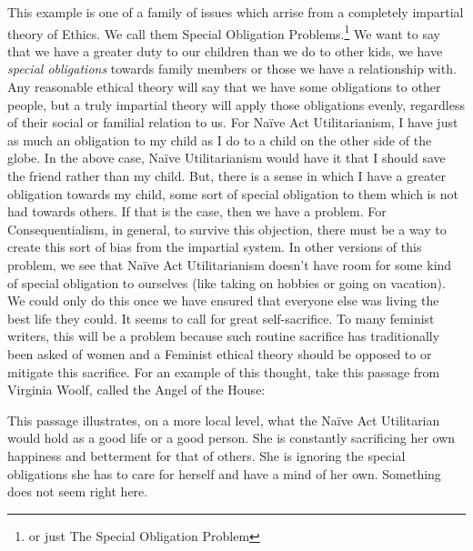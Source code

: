 This example is one of a family of issues which arrise from a completely impartial theory of Ethics. We call them Special Obligation Problems.\footnote{or just The Special Obligation Problem} We want to say that we have a greater duty to our children than we do to other kids, we have \emph{special obligations} towards family members or those we have a relationship with. Any reasonable ethical theory will say that we have some obligations to other people, but a truly impartial theory will apply those obligations evenly, regardless of their social or familial relation to us. For Naïve Act Utilitarianism, I have just as much an obligation to my child as I do to a child on the other side of the globe. In the above case, Na\"ive Utilitarianism would have it that I should save the friend rather than my child. But, there is a sense in which I have a greater obligation towards my child, some sort of special obligation to them which is not had towards others. If that is the case, then we have a problem. For Consequentialism, in general, to survive this objection, there must be a way to create this sort of bias from the impartial system. In other versions of this problem, we see that Naïve Act Utilitarianism doesn't have room for some kind of special obligation to ourselves (like taking on hobbies or going on vacation). We could only do this once we have ensured that everyone else was living the best life they could. It seems to call for great self-sacrifice. To many feminist writers, this will be a problem because such routine sacrifice has traditionally been asked of women and a Feminist ethical theory should be opposed to or mitigate this sacrifice. For an example of this thought, take this passage from Virginia Woolf, called the Angel of the House:\autocite{Woolf1}


This passage illustrates, on a more local level, what the Naïve Act Utilitarian would hold as a good life or a good person. She is constantly sacrificing her own happiness and betterment for that of others. She is ignoring the special obligations she has to care for herself and have a mind of her own.  Something does not seem right here. 

